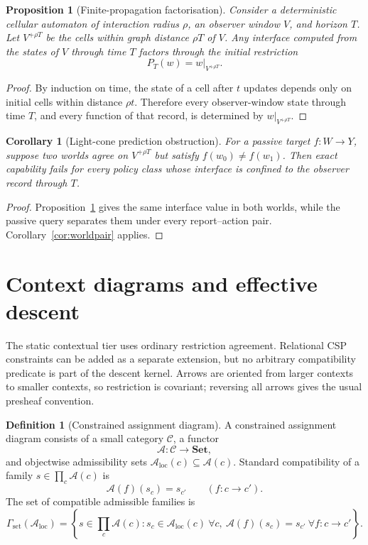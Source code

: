 \documentclass[11pt]{article}
\theoremstyle{plain}
\newtheorem{proposition}[theorem]{Proposition}
\newtheorem{corollary}[theorem]{Corollary}
\theoremstyle{definition}
\newtheorem{definition}[theorem]{Definition}
\theoremstyle{remark}
\newcommand{\LocalAdm}{\mathcal{A}_{\mathrm{loc}}}
\begin{document}
\begin{proposition}[Finite-propagation factorisation]\label{prop:lightcone}
Consider a deterministic cellular automaton of interaction radius $\rho$, an
observer window $V$, and horizon $T$. Let
$V^{+\rho T}$ be the cells within graph distance $\rho T$ of $V$. Any interface
computed from the states of $V$ through time $T$ factors through the initial
restriction
\[
P_T(w)=w|_{V^{+\rho T}}.
\]
\end{proposition}

\begin{proof}
By induction on time, the state of a cell after $t$ updates depends only on
initial cells within distance $\rho t$. Therefore every observer-window state
through time $T$, and every function of that record, is determined by
$w|_{V^{+\rho T}}$.
\end{proof}

\begin{corollary}[Light-cone prediction obstruction]\label{cor:lightcone}
For a passive target $f:W\to Y$, suppose two worlds agree on
$V^{+\rho T}$ but satisfy $f(w_0)\ne f(w_1)$. Then exact capability fails for
every policy class whose interface is confined to the observer record through
$T$.
\end{corollary}

\begin{proof}
Proposition~\ref{prop:lightcone} gives the same interface value in both worlds,
while the passive query separates them under every report--action pair.
Corollary~\ref{cor:worldpair} applies.
\end{proof}

\section{Context diagrams and effective descent}\label{sec:descent}

The static contextual tier uses ordinary restriction agreement. Relational CSP
constraints can be added as a separate extension, but no arbitrary compatibility
predicate is part of the descent kernel. Arrows are oriented from larger contexts
to smaller contexts, so restriction is covariant; reversing all arrows gives the
usual presheaf convention.

\begin{definition}[Constrained assignment diagram]\label{def:restr}
A constrained assignment diagram consists of a small category $\mathcal C$, a
functor
\[
\mathcal A:\mathcal C\to\mathbf{Set},
\]
and objectwise admissibility sets
$\LocalAdm(c)\subseteq\mathcal A(c)$. Standard compatibility of a family
$s\in\prod_c\mathcal A(c)$ is
\[
\mathcal A(f)(s_c)=s_{c'}
\qquad(f:c\to c').
\]
The set of compatible admissible families is
\[
\Gamma_{\mathrm{set}}(\LocalAdm)=
\left\{s\in\prod_c\mathcal A(c):
 s_c\in\LocalAdm(c)\ \forall c,
 \ \mathcal A(f)(s_c)=s_{c'}\ \forall f:c\to c'\right\}.
\]
\end{definition}
\end{document}
